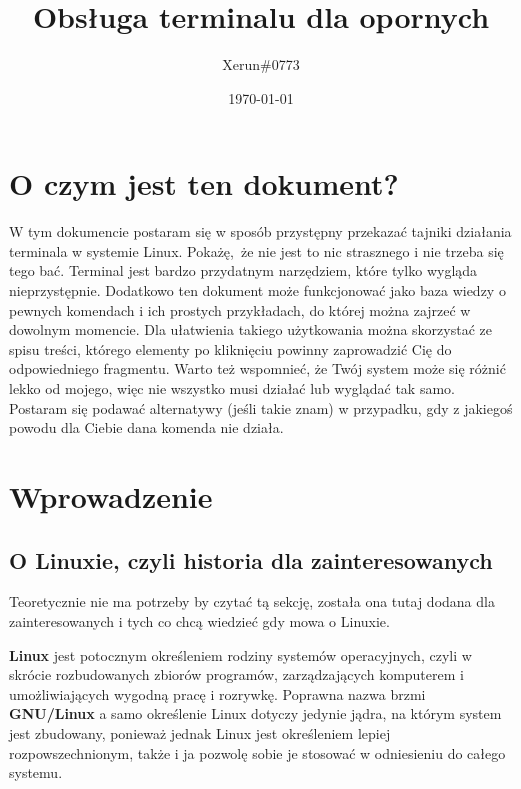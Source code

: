 \documentclass[12pt]{article}
\title{Obsługa terminalu dla opornych}
\author{Xerun\#0773}
\date{\today}
\begin{document}
\begin{titlepage}
    \null  %
    \nointerlineskip  %
    \vfill
    \let\snewpage \newpage
    \let\newpage \relax
    \maketitle
    \let \newpage \snewpage
    \vfill 
    \break %
\end{titlepage}

\section*{O czym jest ten dokument?}
    W tym dokumencie postaram się w sposób przystępny przekazać tajniki działania terminala w systemie Linux. Pokażę, że nie jest to nic strasznego i nie trzeba się tego bać. Terminal jest bardzo przydatnym narzędziem, które tylko wygląda nieprzystępnie. Dodatkowo ten dokument może funkcjonować jako baza wiedzy o pewnych komendach i ich prostych przykładach, do której można zajrzeć w dowolnym momencie. Dla ułatwienia takiego użytkowania można skorzystać ze spisu treści, którego elementy po kliknięciu powinny zaprowadzić Cię do odpowiedniego fragmentu. Warto też wspomnieć, że Twój system może się różnić lekko od mojego, więc nie wszystko musi działać lub wyglądać tak samo. Postaram się podawać alternatywy (jeśli takie znam) w przypadku, gdy z jakiegoś powodu dla Ciebie dana komenda nie działa.

\newpage
{\hypersetup{hidelinks}\tableofcontents}
\newpage
\section{Wprowadzenie}
\subsection{O Linuxie, czyli historia dla zainteresowanych}

Teoretycznie nie ma potrzeby by czytać tą sekcję, została ona tutaj dodana dla zainteresowanych i tych co chcą wiedzieć  gdy mowa o Linuxie.

\textbf{Linux} jest potocznym określeniem rodziny systemów operacyjnych, czyli w skrócie rozbudowanych zbiorów programów, zarządzających komputerem i umożliwiających wygodną pracę i rozrywkę. Poprawna nazwa brzmi \textbf{GNU/Linux} a samo określenie Linux dotyczy jedynie jądra, na którym system jest zbudowany, ponieważ jednak Linux jest określeniem lepiej rozpowszechnionym, także i ja pozwolę sobie je stosować w odniesieniu do całego systemu.
\end{document}
